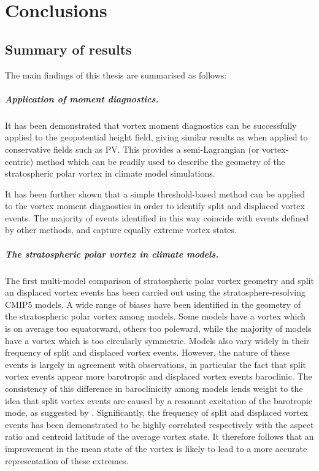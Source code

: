 \chapter{Conclusions}
\label{cha:conclusions}

\section{Summary of results}

The main findings of this thesis are summarised as follows: 

\paragraph{Application of moment diagnostics.} It has been demonstrated that
vortex moment diagnostics can be successfully applied to the geopotential height
field, giving similar results as when applied to conservative fields such as
PV. This provides a semi-Lagrangian (or vortex-centric) method which can be
readily used to describe the geometry of the stratospheric polar vortex in
climate model simulations.

It has been further shown that a simple threshold-based method can be applied to
the vortex moment diagnostics in order to identify split and displaced vortex
events. The majority of events identified in this way coincide with events
defined by other methods, and capture equally extreme vortex states.

\paragraph{The stratospheric polar vortex in climate models.} The first
multi-model comparison of stratospheric polar vortex geometry and split an
displaced vortex events has been carried out using the stratosphere-resolving
CMIP5 models. A wide range of biases have been identified in the geometry of the
stratospheric polar vortex among models. Some models have a vortex which is on
average too equatorward, others too poleward, while the majority of models have
a vortex which is too circularly symmetric. Models also vary widely in their
frequency of split and displaced vortex events. However, the nature of these
events is largely in agreement with observations, in particular the fact that
split vortex events appear more barotropic and displaced vortex events
baroclinic. The consistency of this difference in baroclinicity among models
lends weight to the idea that split vortex events are caused by a resonant
excitation of the barotropic mode, as suggested by
\citet{Esler2005}. Significantly, the frequency of split and displaced vortex
events has been demonstrated to be highly correlated respectively with the aspect
ratio and centroid latitude of the average vortex state. It therefore follows
that an improvement in the mean state of the vortex is likely to lead to a more
accurate representation of these extremes.

